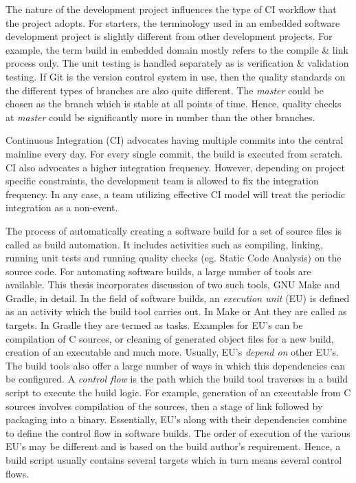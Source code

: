 \documentclass[12pt, a4paper, titlepage]{scrartcl}
\newcommand{\courierword}[1]{\textsf{\itshape #1}}{\fontfamily{pcr}\selectfont}%
\begin{document}
\par The nature of the development project influences the type of CI workflow that the project adopts. For starters, the terminology used in an embedded software development project is slightly different from other development projects. For example, the term build in embedded domain mostly refers to the compile \& link process only. The unit testing is handled separately as is verification \& validation testing. If Git is the version control system in use, then the quality standards on the different types of branches are also quite different. The \courierword{master} could be chosen as the branch which is stable at all points of time. Hence, quality checks at \courierword{master} could be significantly more in number than the other branches. 
\par Continuous Integration (CI) advocates having multiple commits into the central mainline every day. For every single commit, the build is executed from scratch. CI also advocates a higher integration frequency. However, depending on project specific constraints, the development team is allowed to fix the integration frequency. In any case, a team utilizing effective CI model will treat the periodic integration as a non-event\cite{fowler2006continuous}.  
\par The process of automatically creating a software build for a set of source files is called as build automation. It includes activities such as compiling, linking, running unit tests and running quality checks (eg. Static Code Analysis) on the source code. For automating software builds, a large number of tools are available. This thesis incorporates discussion of two such tools, GNU Make\cite{GNUMakeManual} and Gradle\cite{dockter2015gradle}, in detail. In the field of software builds, an \emph{execution unit} (EU) is defined as an activity which the build tool carries out. In Make or Ant they are called as targets. In Gradle they are termed as tasks. Examples for EU's can be compilation of C sources, or cleaning of generated object files for a new build, creation of an executable and much more. Usually, EU's \textit{depend on} other EU's. The build tools also offer a large number of ways in which this dependencies can be configured. A \emph{control flow} is the path which the build tool traverses in a build script to execute the build logic. For example, generation of an executable from C sources involves compilation of the sources, then a stage of link followed by packaging into a binary. Essentially, EU's along with their dependencies combine to define the control flow in software builds. The order of execution of the various EU's may be different and is based on the build author's requirement. Hence, a build script usually contains several targets which in turn means several control flows.  
\end{document}

